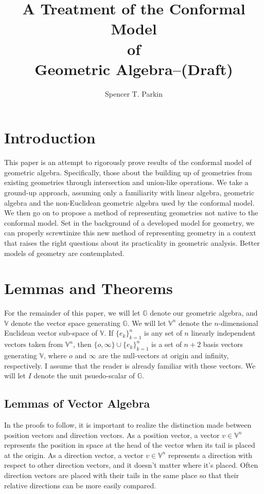 \documentclass{article}
\title{A Treatment of the Conformal Model\\of\\Geometric Algebra--(Draft)}
\author{Spencer T. Parkin}
\newcommand{\V}{\mathbb{V}}
\newcommand{\G}{\mathbb{G}}
\newcommand{\nvao}{o}
\newcommand{\nvai}{\infty}
\begin{document}
\maketitle

\section{Introduction}

This paper is an attempt to rigorously prove results of the conformal model
of geometric algebra.  Specifically, those about the building up of geometries
from existing geometries through intersection and union-like operations.
We take a ground-up approach, assuming only a familiarity
with linear algebra, geometric algebra and the non-Euclidean geometric algebra used
by the conformal model.  We then go on to propose a method of
representing geometries not native to the conformal model.  Set in the background of
a developed model for geometry, we can properly screwtinize this new method of
representing geometry in a context that raises the right questions about its
practicality in geometric analysis.  Better models of geometry are contemplated.

\section{Lemmas and Theorems}\label{sec_lmas_and_thms}

For the remainder of this paper, we will let
$\G$ denote our geometric algebra, and $\V$ denote the vector space generating
$\G$.  We will let $\V^n$ denote the $n$-dimensional Euclidean vector sub-space
of $\V$.  If $\{e_k\}_{k=1}^n$ is any set of $n$ linearly independent vectors
taken from $\V^n$, then $\{\nvao,\nvai\}\cup\{e_k\}_{k=1}^n$ is a set of $n+2$
basis vectors generating $\V$, where $\nvao$ and $\nvai$ are the null-vectors at
origin and infinity, respectively.  I assume that the reader is already familiar
with these vectors.  We will let $I$ denote the unit psuedo-scalar of $\G$.

\subsection{Lemmas of Vector Algebra}\label{sec_thms_of_vec_alg}

In the proofs to follow, it is important to realize the distinction made between
position vectors and direction vectors.  As a position vector, a vector $v\in\V^n$
represents the position in space at the head of the vector when its tail is placed
at the origin.  As a direction vector, a vector $v\in\V^n$ represents a direction
with respect to other direction vectors, and it doesn't matter where it's placed.
Often direction vectors are placed with their tails in the same place so that their
relative directions can be more easily compared.
\end{document}

